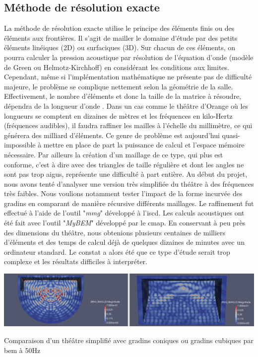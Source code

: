  
	\subsection{Méthode de résolution exacte}

La méthode de résolution exacte utilise le principe des éléments finis ou des éléments aux frontières. Il s'agit de mailler le domaine d'étude par des petits éléments linéiques (2D) ou surfaciques (3D). Sur chacun de ces éléments, on pourra calculer la pression acoustique par résolution de l'équation d'onde (modèle de Green ou Helmotz-Kirchhoff) en considérant les conditions aux limites. Cependant, même si l'implémentation mathématique ne présente pas de difficulté majeure, le problème se complique nettement selon la géométrie de la salle. Effectivement, le nombre d'éléments et donc la taille de la matrice à résoudre, dépendra de la longueur d'onde \cite[p. 740]{beamtracing}. Dans un cas comme le théâtre d'Orange où les longueurs se comptent en dizaines de mètres et les fréquences en kilo-Hertz (fréquences audibles), il faudra raffiner les mailles à l'échelle du millimètre, ce qui générera des milliard d'éléments. Ce genre de problème est aujourd'hui quasi-impossible à mettre en place de part la puissance de calcul et l'espace mémoire nécessaire. Par ailleurs la création d'un maillage de ce type, qui plus est conforme, c'est à dire avec des triangles de taille régulière et dont les angles ne sont pas trop aigus, représente une difficulté à part entière.
Au début du projet, nous avons tenté d'analyser une version très simplifiée du théâtre à des fréquences très faibles. Nous voulions notamment tester l'impact de la forme incurvée des gradins en comparant de manière récursive différents maillages. Le raffinement fut effectué à l'aide de l'outil "\textit{mmg}" développé à l'\gls{iscd}. Les calculs acoustiques ont été fait avec l'outil "\textit{MyBEM}" développé par le \gls{cmap}. En conservant à peu près des dimensions du théâtre, nous obtenions plusieurs centaines de milliers d'éléments et des temps de calcul déjà de quelques dizaines de minutes avec un ordinateur standard. Le constat a alors été que ce type d'étude serait trop complexe et les résultats difficiles à interpréter.

\begin{figureth}
	\includegraphics[width=\linewidth]{images/BEM}
	\caption{Comparaison d'un théâtre simplifié avec gradins coniques ou gradins cubiques par \gls{bem} à 50Hz}
	\label{BEM}
\end{figureth}

